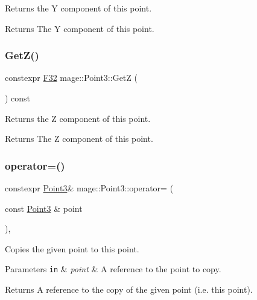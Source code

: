 Returns the Y component of this point.

\begin{DoxyReturn}{Returns}
The Y component of this point. 
\end{DoxyReturn}
\mbox{\label{structmage_1_1_point3_a9dd6e12e7c66eb8b3ab8de6cfa13d612}} 
\subsubsection{\texorpdfstring{Get\+Z()}{GetZ()}}
{\footnotesize\ttfamily constexpr \mbox{\hyperlink{namespacemage_aa97e833b45f06d60a0a9c4fc22ae02c0}{F32}} mage\+::\+Point3\+::\+GetZ (\begin{DoxyParamCaption}{ }\end{DoxyParamCaption}) const\hspace{0.3cm}{\ttfamily [noexcept]}}

Returns the Z component of this point.

\begin{DoxyReturn}{Returns}
The Z component of this point. 
\end{DoxyReturn}
\mbox{\label{structmage_1_1_point3_a84c14c12f0db37457c8b819e224a3482}} 
\subsubsection{\texorpdfstring{operator=()}{operator=()}\hspace{0.1cm}{\footnotesize\ttfamily [1/2]}}
{\footnotesize\ttfamily constexpr \mbox{\hyperlink{structmage_1_1_point3}{Point3}}\& mage\+::\+Point3\+::operator= (\begin{DoxyParamCaption}\item[{const \mbox{\hyperlink{structmage_1_1_point3}{Point3}} \&}]{point }\end{DoxyParamCaption})\hspace{0.3cm}{\ttfamily [default]}, {\ttfamily [noexcept]}}

Copies the given point to this point.


\begin{DoxyParams}[1]{Parameters}
\mbox{\tt in}  & {\em point} & A reference to the point to copy. \\
\hline
\end{DoxyParams}
\begin{DoxyReturn}{Returns}
A reference to the copy of the given point (i.\+e. this point). 
\end{DoxyReturn}
\mbox{\label{structmage_1_1_point3_a6c6e36ec4bbc80e3fe4f690475367482}} 
